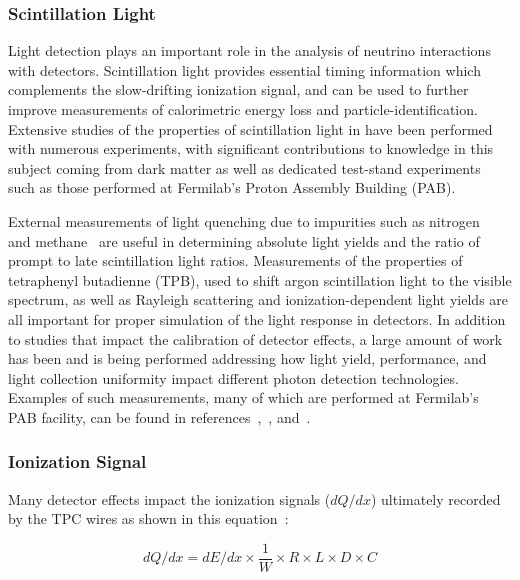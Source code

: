 \subsubsection{Scintillation Light}
Light detection plays an important role in the analysis of neutrino interactions with  detectors. Scintillation light provides essential timing information which complements the slow-drifting ionization signal, and can be used to further improve measurements of calorimetric energy loss and particle-identification. Extensive studies of the properties of scintillation light in  have been performed with numerous experiments, with significant contributions to knowledge in this subject coming from dark matter as well as dedicated test-stand experiments such as those performed at Fermilab's Proton Assembly Building (PAB). 

External measurements of light quenching due to impurities such as nitrogen~\cite{Acciarri:2008kv} and methane~\cite{Jones:2013mfa} are useful in determining absolute light yields and the ratio of prompt to late scintillation light ratios. Measurements of the properties of tetraphenyl butadienne (TPB), used to shift argon scintillation light to the visible spectrum, as well as Rayleigh scattering and ionization-dependent light yields are all important for proper simulation of the light response in  detectors. In addition to studies that impact the calibration of detector effects, a large amount of work has been and is being performed addressing how light yield, performance, and light collection uniformity impact different photon detection %
technologies. Examples of such measurements, many of which are performed at Fermilab's PAB facility, can be found in references~\cite{Cancelo:2018dnf},~\cite{Moss:2016yhb}, and~\cite{Moss:2014ota}.

\subsubsection{Ionization Signal}
Many detector effects impact the ionization signals ($dQ/dx$) ultimately recorded by the TPC wires as shown in this equation~\cite{ARGONEUTrecomb}:

\begin{equation}
dQ/dx = dE/dx \times \frac{1}{W} \times R \times L \times D \times C
\end{equation}

